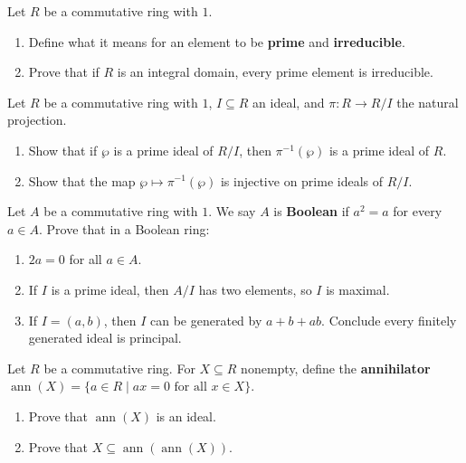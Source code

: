 \documentclass[11pt,twoside,openany]{memoir}
\begin{document}
    \begin{exercise}
    Let $R$ be a commutative ring with $1$.
    \begin{enumerate}[label=(\alph*)]
        \item Define what it means for an element to be \textbf{prime} and \textbf{irreducible}.
        \item Prove that if $R$ is an integral domain, every prime element is irreducible.
    \end{enumerate}
    \end{exercise}
    
    \begin{exercise}
    Let $R$ be a commutative ring with $1$, $I\subseteq R$ an ideal, and $\pi:R\to R/I$ the natural projection.
    \begin{enumerate}[label=(\alph*)]
        \item Show that if $\wp$ is a prime ideal of $R/I$, then $\pi^{-1}(\wp)$ is a prime ideal of $R$.
        \item Show that the map $\wp\mapsto \pi^{-1}(\wp)$ is injective on prime ideals of $R/I$.
    \end{enumerate}
    \end{exercise}
    
    \begin{exercise}
    Let $A$ be a commutative ring with $1$. We say $A$ is \textbf{Boolean} if $a^2=a$ for every $a\in A$. Prove that in a Boolean ring:
    \begin{enumerate}[label=(\alph*)]
        \item $2a=0$ for all $a\in A$.
        \item If $I$ is a prime ideal, then $A/I$ has two elements, so $I$ is maximal.
        \item If $I=(a,b)$, then $I$ can be generated by $a+b+ab$. Conclude every finitely generated ideal is principal.
    \end{enumerate}
    \end{exercise}
    
    \newpage
    \begin{exercise}
    Let $R$ be a commutative ring. For $X\subseteq R$ nonempty, define the \textbf{annihilator} $\operatorname{ann}(X)=\{a\in R\mid ax=0\text{ for all }x\in X\}$.
    \begin{enumerate}[label=(\alph*)]
        \item Prove that $\operatorname{ann}(X)$ is an ideal.
        \item Prove that $X\subseteq \operatorname{ann}(\operatorname{ann}(X))$.
    \end{enumerate}
    \end{exercise}
    
\end{document}
